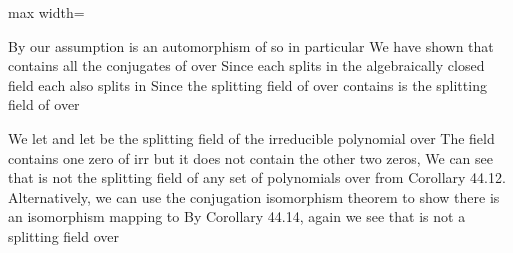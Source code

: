 \documentclass[11pt,oneside]{article}
\begin{document}
\BookNarrativetrue

\begin{BookBody}

\begin{center}\begin{adjustbox}{max width=\linewidth}\end{adjustbox}\end{center}

\noindent By our assumption\BookInline{,\allowbreak \sigma } is an automorphism of  so in particular We have shown that  contains all the conjugates of  over  Since each  splits in the algebraically closed field  each  also splits in  Since the splitting field of  over  contains  is the splitting field of  over \BookEnd{\blacklozenge}

 We let  and let  be the splitting field of the irreducible polynomial  over  The field  contains  one zero of irr  but it does not contain the other two zeros,  We can see that  is not the splitting field of any set of polynomials over  from Corollary 44.12. Alternatively, we can use the conjugation isomorphism theorem to show there is an isomorphism mapping  to  By Corollary 44.14, again we see that  is not a splitting field over \BookEnd{\blacktriangle}

\end{BookBody}

\BookNarrativefalse
\end{document}
